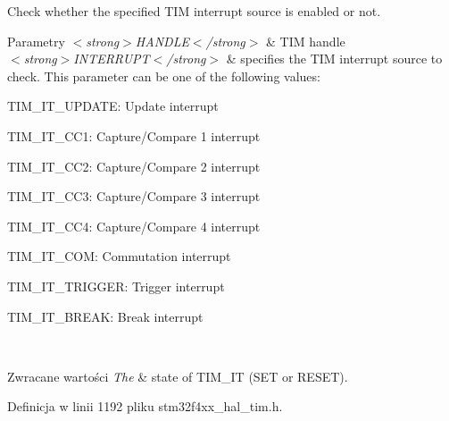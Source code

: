 Check whether the specified T\+IM interrupt source is enabled or not. 


\begin{DoxyParams}{Parametry}
{\em $<$strong$>$\+H\+A\+N\+D\+L\+E$<$/strong$>$} & T\+IM handle \\
\hline
{\em $<$strong$>$\+I\+N\+T\+E\+R\+R\+U\+P\+T$<$/strong$>$} & specifies the T\+IM interrupt source to check. This parameter can be one of the following values\+: \begin{DoxyItemize}
\item T\+I\+M\+\_\+\+I\+T\+\_\+\+U\+P\+D\+A\+TE\+: Update interrupt \item T\+I\+M\+\_\+\+I\+T\+\_\+\+C\+C1\+: Capture/\+Compare 1 interrupt \item T\+I\+M\+\_\+\+I\+T\+\_\+\+C\+C2\+: Capture/\+Compare 2 interrupt \item T\+I\+M\+\_\+\+I\+T\+\_\+\+C\+C3\+: Capture/\+Compare 3 interrupt \item T\+I\+M\+\_\+\+I\+T\+\_\+\+C\+C4\+: Capture/\+Compare 4 interrupt \item T\+I\+M\+\_\+\+I\+T\+\_\+\+C\+OM\+: Commutation interrupt \item T\+I\+M\+\_\+\+I\+T\+\_\+\+T\+R\+I\+G\+G\+ER\+: Trigger interrupt \item T\+I\+M\+\_\+\+I\+T\+\_\+\+B\+R\+E\+AK\+: Break interrupt \end{DoxyItemize}
\\
\hline
\end{DoxyParams}

\begin{DoxyRetVals}{Zwracane wartości}
{\em The} & state of T\+I\+M\+\_\+\+IT (S\+ET or R\+E\+S\+ET). \\
\hline
\end{DoxyRetVals}


Definicja w linii 1192 pliku stm32f4xx\+\_\+hal\+\_\+tim.\+h.

\mbox{\label{group___t_i_m___exported___macros_gac73f5e7669d92971830481e7298e98ba}} 
